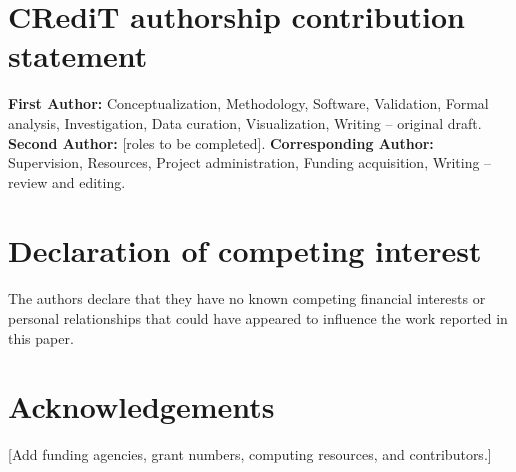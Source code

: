 \documentclass[preprint,review,12pt]{elsarticle}
\begin{document}
\section*{CRediT authorship contribution statement}

\textbf{First Author:} Conceptualization, Methodology, Software, Validation,
Formal analysis, Investigation, Data curation, Visualization, Writing --
original draft. \textbf{Second Author:} [roles to be completed].
\textbf{Corresponding Author:} Supervision, Resources, Project administration,
Funding acquisition, Writing -- review and editing.

\section*{Declaration of competing interest}

The authors declare that they have no known competing financial interests or
personal relationships that could have appeared to influence the work
reported in this paper.

\section*{Acknowledgements}

[Add funding agencies, grant numbers, computing resources, and contributors.]



\end{document}
